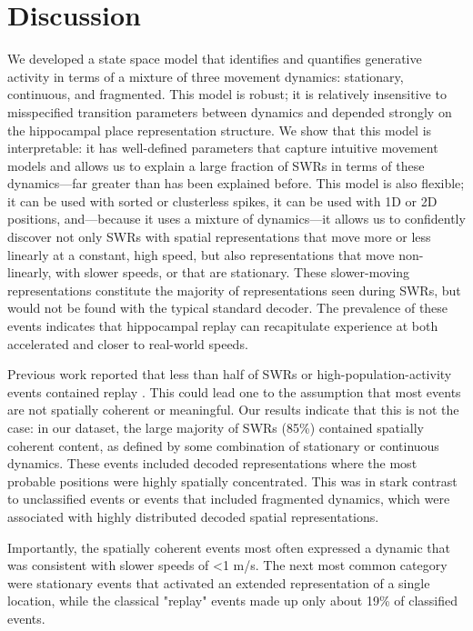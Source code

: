 \documentclass[times, twoside]{zHenriquesLab-StyleBioRxiv}
\begin{document}
\section*{Discussion}
We developed a state space model that identifies and quantifies generative activity in terms of a mixture of three movement dynamics: stationary, continuous, and fragmented. This model is robust; it is relatively insensitive to misspecified transition parameters between dynamics and depended strongly on the hippocampal place representation structure. We show that this model is interpretable: it has well-defined parameters that capture intuitive movement models and allows us to explain a large fraction of SWRs in terms of these dynamics---far greater than has been explained before. This model is also flexible; it can be used with sorted or clusterless spikes, it can be used with 1D or 2D positions, and---because it uses a mixture of dynamics---it allows us to confidently discover not only SWRs with spatial representations that move more or less linearly at a constant, high speed, but also representations that move non-linearly, with slower speeds, or that are stationary. These slower-moving representations constitute the majority of representations seen during SWRs, but would not be found with the typical standard decoder. The prevalence of these events indicates that hippocampal replay can recapitulate experience at both accelerated and closer to real-world speeds.

Previous work reported that less than half of SWRs or high-population-activity events contained replay \cite{KarlssonAwakereplayremote2009, FosterReversereplaybehavioural2006, DavidsonHippocampalReplayExtended2009}. This could lead one to the assumption that most events are not spatially coherent or meaningful. Our results indicate that this is not the case: in our dataset, the large majority of SWRs (85\%) contained spatially coherent content, as defined by some combination of stationary or continuous dynamics. These events included decoded representations where the most probable positions were highly spatially concentrated. This was in stark contrast to unclassified events or events that included fragmented dynamics, which were associated with highly distributed decoded spatial representations. 

Importantly, the spatially coherent events most often expressed a dynamic that was consistent with slower speeds of <1 m/s. The next most common category were stationary events \cite{JaiDistincthippocampalcorticalmemory2017, FarooqEmergencepreconfiguredplastic2019} that activated an extended representation of a single location, while the classical "replay" events made up only about 19\% of classified events. 
\end{document}
